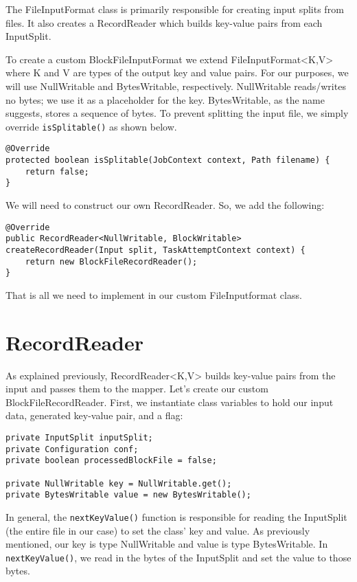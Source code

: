 \documentclass[9pt,twocolumn,twoside]{idsi}
\begin{document}
The FileInputFormat class is primarily responsible for creating input splits from files. It also creates a RecordReader which builds key-value pairs from each InputSplit.

To create a custom BlockFileInputFormat we extend FileInputFormat<K,V> where K and V are types of the output key and value pairs. For our purposes, we will use NullWritable and BytesWritable, respectively. NullWritable reads/writes no bytes; we use it as a placeholder for the key. BytesWritable, as the name suggests, stores a sequence of bytes. To prevent splitting the input file, we simply override \lstinline{isSplitable()} as shown below.

\lstset{language=Java}
\begin{lstlisting}
@Override
protected boolean isSplitable(JobContext context, Path filename) {
    return false;
}
\end{lstlisting}

We will need to construct our own RecordReader. So, we add the following:

\begin{lstlisting}
@Override
public RecordReader<NullWritable, BlockWritable> createRecordReader(Input split, TaskAttemptContext context) {
    return new BlockFileRecordReader();
}
\end{lstlisting}

That is all we need to implement in our custom FileInputformat class.

\section{RecordReader}

As explained previously, RecordReader<K,V> builds key-value pairs from the input and passes them to the mapper. Let's create our custom BlockFileRecordReader. First, we instantiate class variables to hold our input data, generated key-value pair, and a flag:

\begin{lstlisting}
private InputSplit inputSplit;
private Configuration conf;
private boolean processedBlockFile = false;

private NullWritable key = NullWritable.get();
private BytesWritable value = new BytesWritable();
\end{lstlisting}

In general, the \lstinline{nextKeyValue()} function is responsible for reading the InputSplit (the entire file in our case) to set the class' key and value. As previously mentioned, our key is type NullWritable and value is type BytesWritable. In \lstinline{nextKeyValue()}, we read in the bytes of the InputSplit and set the value to those bytes.
\end{document}
